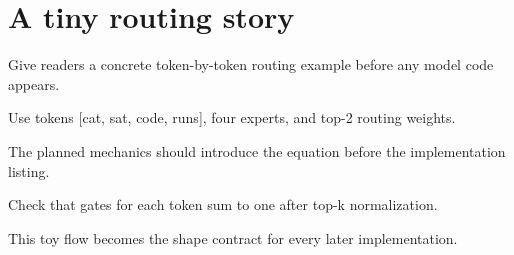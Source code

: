 \section{A tiny routing story}
\label{sec:ch01-a-tiny-routing-story}

Give readers a concrete token-by-token routing example before any model code appears.



Use tokens [cat, sat, code, runs], four experts, and top-2 routing weights.



The planned mechanics should introduce the equation before the implementation listing.





\begin{checkpointbox}
Check that gates for each token sum to one after top-k normalization.
\end{checkpointbox}

This toy flow becomes the shape contract for every later implementation.
